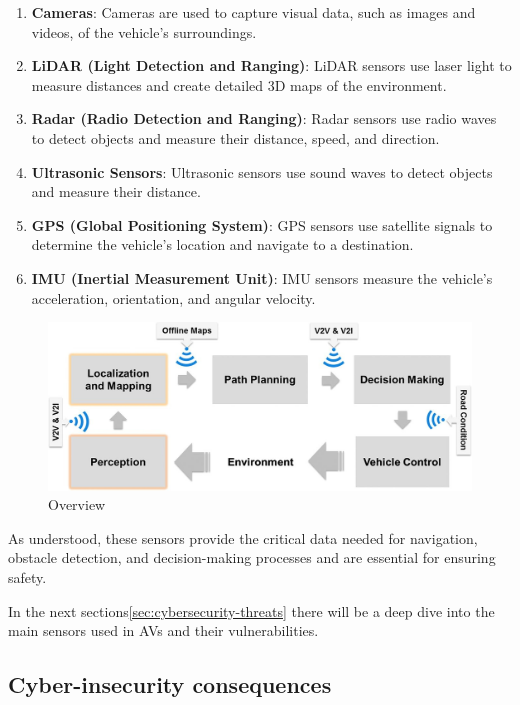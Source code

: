\begin{enumerate}
    \item \textbf{Cameras}: Cameras are used to capture visual data, such as images and videos, of the vehicle's surroundings.
    \item \textbf{LiDAR (Light Detection and Ranging)}: LiDAR sensors use laser light to measure distances and create detailed 3D maps of the environment.
    \item \textbf{Radar (Radio Detection and Ranging)}: Radar sensors use radio waves to detect objects and measure their distance, speed, and direction.
    \item \textbf{Ultrasonic Sensors}: Ultrasonic sensors use sound waves to detect objects and measure their distance.
    \item \textbf{GPS (Global Positioning System)}: GPS sensors use satellite signals to determine the vehicle's location and navigate to a destination.
    \item \textbf{IMU (Inertial Measurement Unit)}: IMU sensors measure the vehicle's acceleration, orientation, and angular velocity.
\end{enumerate}

\begin{figure}[!htb]
    \centering
    \includegraphics[width=0.7\linewidth]{figures/perception}
    \caption{Overview}
    \label{fig:sensors}
\end{figure}

As understood, these sensors provide the critical data needed for navigation, obstacle
detection, and decision-making processes and are essential for ensuring safety\cite{unknown2020connected,cybersec}.

In the next sections\ref{sec:cybersecurity-threats} there will be a deep dive into the main sensors used in AVs and their vulnerabilities.

\subsection{Cyber-insecurity consequences}\label{subsec:cyber-insecurity}

